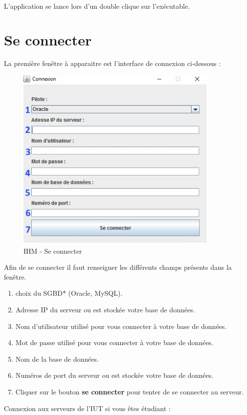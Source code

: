 L'application se lance lors d'un double clique sur l'exécutable.

\section{Se connecter}
La première fen\^etre à apparaitre est l'interface de connexion ci-dessous :
\begin{figure}[!h]
\centering
\includegraphics[width=10cm]{./images/manuel/se_connecter.jpg}
\caption{IHM - Se connecter}
\label{se_connecter}
\end{figure}

Afin de se connecter il faut renseigner les différents champs présents dans la fen\^etre.

\begin{enumerate}
\item choix du SGBD* (Oracle, MySQL).
\item Adresse IP du serveur ou est stockée votre base de données.
\item Nom d'utilisateur utilisé pour vous connecter à votre base de données. 
\item Mot de passe utilisé pour vous connecter à votre base de données.
\item Nom de la base de données.
\item Numéros de port du serveur ou est stockée votre base de données.
\item Cliquer sur le bouton \textbf{se connecter} pour tenter de se connecter au serveur.
\end{enumerate}

Connexion aux serveurs de l'IUT si vous \^etes étudiant :\\

